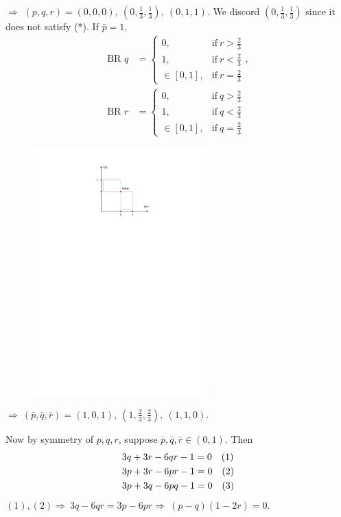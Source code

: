 $\Longrightarrow$ $(p, q, r) = (0, 0, 0),\ (0, \frac{1}{3}, \frac{1}{3}), \ (0, 1, 1)$. We discord $(0, \frac{1}{3}, \frac{1}{3})$ since it does not satisfy (*). If $\bar{p} = 1$,
\begin{align*}
    \text{BR }q &= \left\lbrace\begin{array}{ll}
        0, & \text{if} \ r>\frac{2}{3} \\
        1, & \text{if} \ r<\frac{2}{3} \\
        \in[0, 1], &\text{if} \ r = \frac{2}{3}
    \end{array}\right. ,\\
    \text{BR }r &= \left\lbrace\begin{array}{ll}
        0, & \text{if} \ q>\frac{2}{3} \\
        1, & \text{if} \ q<\frac{2}{3} \\
        \in[0, 1], &\text{if} \ q = \frac{2}{3}
    \end{array}\right. 
\end{align*}
\begin{figure}[H]
    \centering
    \includegraphics[width = 0.6\textwidth, trim = {4cm, 21cm, 3cm, 2cm}, clip]{document/0423-1.pdf}
\end{figure}
$\Longrightarrow\ (\bar{p}, \bar{q}, \bar{r}) = (1, 0, 1),\ (1, \frac{2}{3}, \frac{2}{3}), \ (1, 1, 0)$.

Now by symmetry of $p, q, r$, suppose $\bar{p}, \bar{q}, \bar{r} \in (0, 1)$. Then 
\begin{align*}
    &3q+3r-6qr-1 = 0 {\hfill\quad (1)} \\
    &3p+3r-6pr-1=0 {\hfill\quad (2)} \\
    &3p+3q-6pq-1=0 {\hfill\quad (3)}
\end{align*}
$(1), (2)\Longrightarrow\ 3q-6qr = 3p-6pr \Longrightarrow \ (p-q)(1-2r) = 0$.

